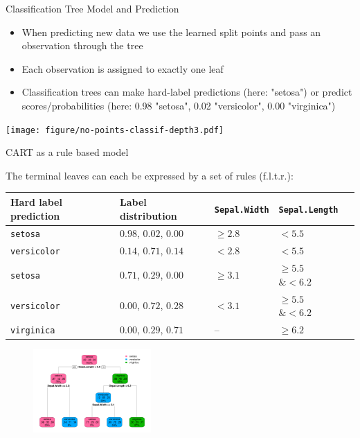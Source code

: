 \documentclass[11pt,compress,t,notes=noshow, xcolor=table]{beamer}
\begin{document}
\begin{vbframe}{Classification Tree Model and Prediction}
\begin{itemize}
\item When predicting new data we use the learned split points and pass an observation through the tree
\item Each observation is assigned to exactly one leaf
\item Classification trees can make hard-label predictions (here: "setosa") or predict scores/probabilities (here: 0.98 "setosa", 0.02 "versicolor", 0.00 "virginica")
\end{itemize}

\color{fgcolor}
{\centering \texttt{[image: figure/no-points-classif-depth3.pdf]}

}
\end{vbframe}

\begin{vbframe}{CART as a rule based model}

The terminal leaves can each be expressed by a set of rules (f.l.t.r.):

\begin{table}[]
\begin{tabular}{lllll}
Hard label prediction &  Label distribution & \texttt{Sepal.Width} & \texttt{Sepal.Length} \\
\hline
\texttt{setosa} & $0.98$, $0.02$, $0.00$ & $\geq 2.8$ & $< 5.5$ \\
\texttt{versicolor} & $0.14$, $0.71$, $0.14$ & $<2.8$ & $< 5.5$ \\
\texttt{setosa} & $0.71$, $0.29$, $0.00$ & $\geq 3.1$ & $\geq 5.5$ $\& < 6.2$ \\
\texttt{versicolor} & $0.00$, $0.72$, $0.28$ & $< 3.1$ & $\geq 5.5$ $\& < 6.2$\\
\texttt{virginica} & $0.00$, $0.29$, $0.71$ &  -- & $\geq 6.2$ \\

\end{tabular}
\end{table}

\begin{figure} 
\includegraphics[width=0.4\textwidth, keepaspectratio]{figure_man/tree_depth3_structure_wide.png}
\end{figure}


\end{vbframe}
\end{document}
